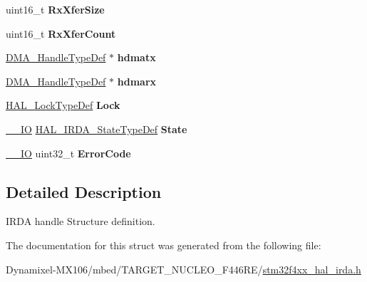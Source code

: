 \begin{DoxyCompactItemize}
\item 
uint16\+\_\+t {\bfseries Rx\+Xfer\+Size}\hypertarget{struct_i_r_d_a___handle_type_def_a27d4e1ae2a8bf887e9211fcf4d6e8123}{}\label{struct_i_r_d_a___handle_type_def_a27d4e1ae2a8bf887e9211fcf4d6e8123}

\item 
uint16\+\_\+t {\bfseries Rx\+Xfer\+Count}\hypertarget{struct_i_r_d_a___handle_type_def_aaa6cd4f399c20becc3ac1b29a0cf7519}{}\label{struct_i_r_d_a___handle_type_def_aaa6cd4f399c20becc3ac1b29a0cf7519}

\item 
\hyperlink{group___d_m_a___exported___types_ga41b754a906b86bce54dc79938970138b}{D\+M\+A\+\_\+\+Handle\+Type\+Def} $\ast$ {\bfseries hdmatx}\hypertarget{struct_i_r_d_a___handle_type_def_ae6312ee04060bdee085cab0783c6b211}{}\label{struct_i_r_d_a___handle_type_def_ae6312ee04060bdee085cab0783c6b211}

\item 
\hyperlink{group___d_m_a___exported___types_ga41b754a906b86bce54dc79938970138b}{D\+M\+A\+\_\+\+Handle\+Type\+Def} $\ast$ {\bfseries hdmarx}\hypertarget{struct_i_r_d_a___handle_type_def_a0d791be165c364a79ceba327d62b3b22}{}\label{struct_i_r_d_a___handle_type_def_a0d791be165c364a79ceba327d62b3b22}

\item 
\hyperlink{stm32f4xx__hal__def_8h_ab367482e943333a1299294eadaad284b}{H\+A\+L\+\_\+\+Lock\+Type\+Def} {\bfseries Lock}\hypertarget{struct_i_r_d_a___handle_type_def_afa006400e8e380d565ab8a57329bb864}{}\label{struct_i_r_d_a___handle_type_def_afa006400e8e380d565ab8a57329bb864}

\item 
\hyperlink{core__sc300_8h_aec43007d9998a0a0e01faede4133d6be}{\+\_\+\+\_\+\+IO} \hyperlink{group___i_r_d_a___exported___types_gab3e65b75c9d4ae39bc50a31222509e1e}{H\+A\+L\+\_\+\+I\+R\+D\+A\+\_\+\+State\+Type\+Def} {\bfseries State}\hypertarget{struct_i_r_d_a___handle_type_def_a849a7d769679408b58acf434f118ab4b}{}\label{struct_i_r_d_a___handle_type_def_a849a7d769679408b58acf434f118ab4b}

\item 
\hyperlink{core__sc300_8h_aec43007d9998a0a0e01faede4133d6be}{\+\_\+\+\_\+\+IO} uint32\+\_\+t {\bfseries Error\+Code}\hypertarget{struct_i_r_d_a___handle_type_def_ae88563ed7396e3cfe918077612cd9c65}{}\label{struct_i_r_d_a___handle_type_def_ae88563ed7396e3cfe918077612cd9c65}

\end{DoxyCompactItemize}


\subsection{Detailed Description}
I\+R\+DA handle Structure definition. 

The documentation for this struct was generated from the following file\+:\begin{DoxyCompactItemize}
\item 
Dynamixel-\/\+M\+X106/mbed/\+T\+A\+R\+G\+E\+T\+\_\+\+N\+U\+C\+L\+E\+O\+\_\+\+F446\+R\+E/\hyperlink{stm32f4xx__hal__irda_8h}{stm32f4xx\+\_\+hal\+\_\+irda.\+h}\end{DoxyCompactItemize}
